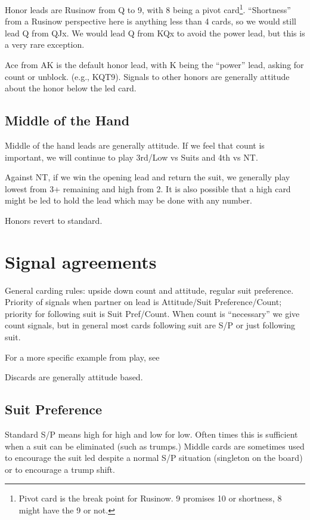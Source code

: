 \documentclass[tom-ari]{subfiles}
\begin{document}
Honor leads are Rusinow from Q to 9, with 8 being a pivot card\footnote{Pivot card is the break point for Rusinow. 9 promises 10 or shortness, 8 might have the 9 or not.}. ``Shortness'' from a Rusinow perspective here is anything less than 4 cards, so we would still lead Q from QJx. We would lead Q from KQx to avoid the power lead, but this is a very rare exception.  

Ace from AK is the default honor lead, with K being the ``power'' lead, asking for count or unblock. (e.g., KQT9). Signals to other honors are generally attitude about the honor below the led card.


\section{Middle of the Hand}

Middle of the hand leads are generally attitude. If we feel that count is important, we will continue to play 3rd/Low vs Suits and 4th vs NT.

Against NT, if we win the opening lead and return the suit, we generally play lowest from 3+ remaining and high from 2. It is also possible that a high card might be led to hold the lead which may be done with any number.

Honors revert to standard. 

\chapter{Signal agreements}

General carding rules: upside down count and attitude, regular suit preference. Priority of signals when partner on lead is Attitude/Suit Preference/Count; priority for following suit is Suit Pref/Count. When count is ``necessary'' we give count signals, but in general most cards following suit are S/P or just following suit.

For a more specific example from play, see 

Discards are generally attitude based.

\section{Suit Preference}  

Standard S/P means high for high and low for low.  Often times this is sufficient when a suit can be eliminated (such as trumps.) Middle cards are sometimes used to encourage the suit led despite a normal S/P situation (singleton on the board) or to encourage a trump shift.
\end{document}
